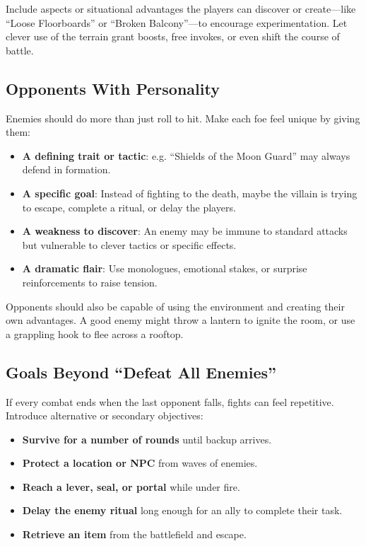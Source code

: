 \begin{multicols}{2}
Include aspects or situational advantages the players can discover or create—like “Loose Floorboards” or “Broken Balcony”—to encourage experimentation. Let clever use of the terrain grant boosts, free invokes, or even shift the course of battle.

\subsection*{Opponents With Personality}

Enemies should do more than just roll to hit. Make each foe feel unique by giving them:

\begin{itemize}
  \item \textbf{A defining trait or tactic}: e.g. “Shields of the Moon Guard” may always defend in formation.
  \item \textbf{A specific goal}: Instead of fighting to the death, maybe the villain is trying to escape, complete a ritual, or delay the players.
  \item \textbf{A weakness to discover}: An enemy may be immune to standard attacks but vulnerable to clever tactics or specific effects.
  \item \textbf{A dramatic flair}: Use monologues, emotional stakes, or surprise reinforcements to raise tension.
\end{itemize}

Opponents should also be capable of using the environment and creating their own advantages. A good enemy might throw a lantern to ignite the room, or use a grappling hook to flee across a rooftop.

\subsection*{Goals Beyond “Defeat All Enemies”}

If every combat ends when the last opponent falls, fights can feel repetitive. Introduce alternative or secondary objectives:

\begin{itemize}
  \item \textbf{Survive for a number of rounds} until backup arrives.
  \item \textbf{Protect a location or NPC} from waves of enemies.
  \item \textbf{Reach a lever, seal, or portal} while under fire.
  \item \textbf{Delay the enemy ritual} long enough for an ally to complete their task.
  \item \textbf{Retrieve an item} from the battlefield and escape.
\end{itemize}


\end{multicols}
